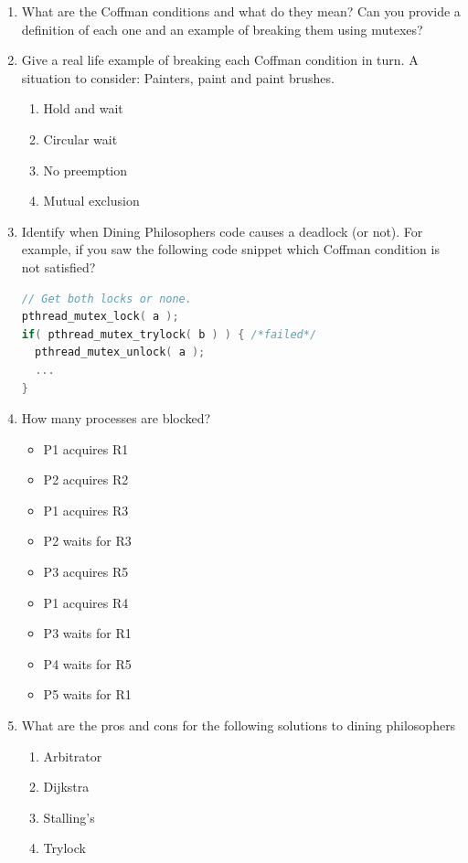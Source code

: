 \begin{enumerate}

\item What are the Coffman conditions and what do they mean? Can you provide a definition of each one and an example of breaking them using mutexes?

\item Give a real life example of breaking each Coffman condition in turn. A situation to consider: Painters, paint and paint brushes.

  \begin{enumerate}
  \item Hold and wait
  \item Circular wait
  \item No preemption 
  \item Mutual exclusion
  \end{enumerate}

\item Identify when Dining Philosophers code causes a deadlock (or not). For example, if you saw the following code snippet which Coffman condition is not satisfied?

\begin{lstlisting}[language=C]
// Get both locks or none.
pthread_mutex_lock( a );
if( pthread_mutex_trylock( b ) ) { /*failed*/
  pthread_mutex_unlock( a );
  ...
}
\end{lstlisting}

\item How many processes are blocked?

\begin{itemize}
\tightlist
\item
  P1 acquires R1
\item
  P2 acquires R2
\item
  P1 acquires R3
\item
  P2 waits for R3
\item
  P3 acquires R5
\item
  P1 acquires R4
\item
  P3 waits for R1
\item
  P4 waits for R5
\item
  P5 waits for R1
\end{itemize}

\item What are the pros and cons for the following solutions to dining philosophers
  \begin{enumerate}
  \item Arbitrator
  \item Dijkstra
  \item Stalling's
  \item Trylock
  \end{enumerate}
\end{enumerate}


